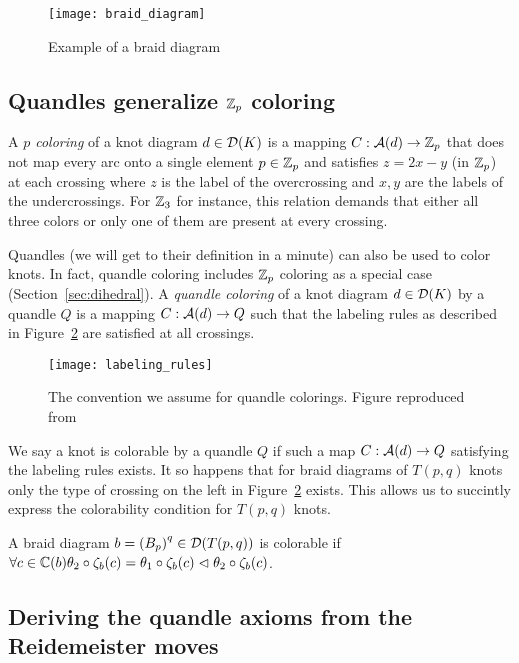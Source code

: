 \documentclass[paper.tex]{subfiles}
\begin{document}
\begin{figure}[h]
  \centering
  \texttt{[image: braid\_diagram]}
  \caption{Example of a braid diagram}\label{fig:braid_diagram}
\end{figure}

\subsection{Quandles generalize $\mathbb{Z}_p$ coloring}

A \emph{$p$ coloring} of a knot diagram $d \in \operatorname{\mathcal{D}}(K)$ is a mapping $C: \mathcal{A}(d) \to \mathbb{Z}_p$ that does not map every arc onto a single element $p \in \mathbb{Z}_p$ and satisfies $z = 2x - y$ (in $\mathbb{Z}_p$) at each crossing where
$z$ is the label of the overcrossing and $x,y$ are the labels of the undercrossings. For $\mathbb{Z}_3$ for instance, this relation demands that either all three colors or only one of them are present at every crossing.

Quandles (we will get to their definition in a minute) can also be used to color knots. In fact, quandle coloring includes $\mathbb{Z}_p$ coloring as a special case (Section~\ref{sec:dihedral}). A \emph{quandle coloring} of a knot diagram
$d \in \operatorname{\mathcal{D}}(K)$ by a quandle $Q$ is a mapping $C: \mathcal{A}(d) \to Q$ such that the labeling rules as described in Figure~\ref{fig:labeling_rules} are satisfied at all crossings.

\begin{figure}[H]
  \centering
  \texttt{[image: labeling\_rules]}
  \caption{The convention we assume for quandle colorings. Figure reproduced from~\cite{Cusick}}\label{fig:labeling_rules}
\end{figure}


We say a knot is colorable by a quandle $Q$ if such a map $C: \mathcal{A}(d) \to Q$ satisfying the labeling rules exists. It so happens that for braid diagrams of $T(p,q)$ knots only the type of crossing on the left in
Figure~\ref{fig:labeling_rules} exists. This allows us to succintly express the colorability condition for $T(p,q)$ knots.

A braid diagram $b = {(B_p)}^q \in \operatorname{\mathcal{D}}(T(p,q))$ is colorable if $\forall c \in  \mathbb{C}(b) \theta_2 \circ \zeta_b(c) = \theta_1 \circ \zeta_b(c) \vartriangleleft \theta_2 \circ \zeta_b(c)$.

\subsection{Deriving the quandle axioms from the Reidemeister moves}
\label{sec:quandle_axioms}
\end{document}
